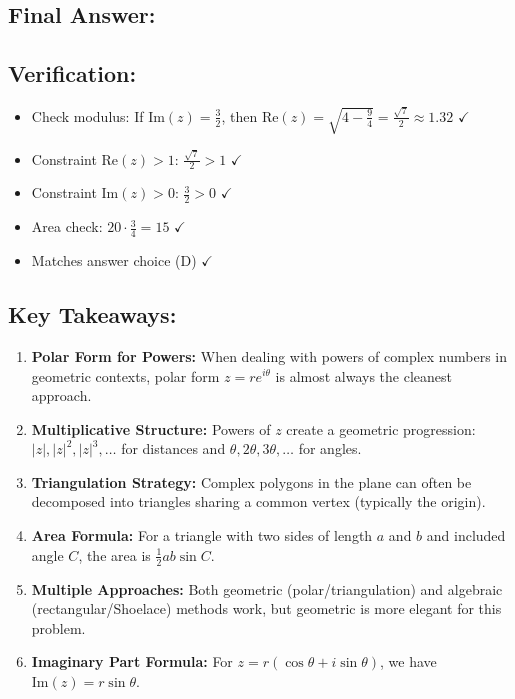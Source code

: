 \documentclass[12pt]{article}
\begin{document}
\subsection*{Final Answer:}

\begin{center}
\end{center}

\vspace{1em}

\subsection*{Verification:}
\begin{itemize}
    \item Check modulus: If $\text{Im}(z) = \frac{3}{2}$, then $\text{Re}(z) = \sqrt{4 - \frac{9}{4}} = \frac{\sqrt{7}}{2} \approx 1.32$ $\checkmark$
    \item Constraint $\text{Re}(z) > 1$: $\frac{\sqrt{7}}{2} > 1$ $\checkmark$
    \item Constraint $\text{Im}(z) > 0$: $\frac{3}{2} > 0$ $\checkmark$
    \item Area check: $20 \cdot \frac{3}{4} = 15$ $\checkmark$
    \item Matches answer choice (D) $\checkmark$
\end{itemize}

\subsection*{Key Takeaways:}

\begin{enumerate}
    \item \textbf{Polar Form for Powers:} When dealing with powers of complex numbers in geometric contexts, polar form $z = re^{i\theta}$ is almost always the cleanest approach.
    
    \item \textbf{Multiplicative Structure:} Powers of $z$ create a geometric progression: $|z|, |z|^2, |z|^3, \ldots$ for distances and $\theta, 2\theta, 3\theta, \ldots$ for angles.
    
    \item \textbf{Triangulation Strategy:} Complex polygons in the plane can often be decomposed into triangles sharing a common vertex (typically the origin).
    
    \item \textbf{Area Formula:} For a triangle with two sides of length $a$ and $b$ and included angle $C$, the area is $\frac{1}{2}ab\sin C$.
    
    \item \textbf{Multiple Approaches:} Both geometric (polar/triangulation) and algebraic (rectangular/Shoelace) methods work, but geometric is more elegant for this problem.
    
    \item \textbf{Imaginary Part Formula:} For $z = r(\cos\theta + i\sin\theta)$, we have $\text{Im}(z) = r\sin\theta$.
\end{enumerate}
\end{document}
